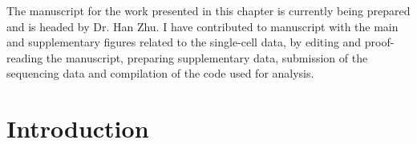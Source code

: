 \begin{Comment2}
\par The manuscript for the work presented in this chapter is currently being prepared and is headed by Dr. Han Zhu. I have contributed to manuscript with the main and supplementary figures related to the single-cell data, by editing and proof-reading the manuscript, preparing supplementary data, submission of the sequencing data and compilation of the code used for analysis.\\

\end{Comment2}

\clearpage





\section{Introduction}
\label{sec:chp2_intro}


